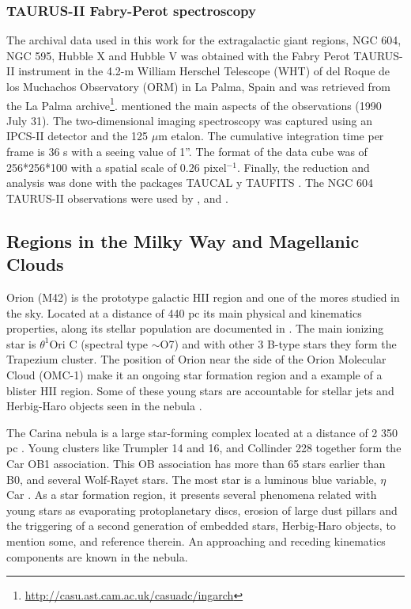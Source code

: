 \documentclass[fleqn,usenatbib, useAMS, a4paper]{mnras}
\begin{document}
\subsubsection{TAURUS-II Fabry-Perot spectroscopy}
\label{sec:taurus-ii-fabry}

The archival data used in this work for the extragalactic giant regions, NGC 604, NGC 595, Hubble X and Hubble V was obtained with the Fabry Perot TAURUS-II instrument in the 4.2-m William Herschel Telescope (WHT) of del Roque de los Muchachos Observatory (ORM) in La Palma, Spain and was retrieved from the La Palma archive\footnote{\url{http://casu.ast.cam.ac.uk/casuadc/ingarch}}.
\citet{sabalisck1995supersonic} mentioned the main aspects of the observations (1990 July 31).
The two-dimensional imaging spectroscopy was captured using an IPCS-II detector and the 125 $\mu$m etalon.
The cumulative integration time per frame is 36 s with a seeing value of 1''.
The format of the data cube was of 256*256*100 with a spatial scale of 0.26 pixel$^{-1}$.
Finally, the reduction and analysis was done with the packages TAUCAL y TAUFITS \citep{1992ASPC...25..445L}. The NGC 604 TAURUS-II observations were used by \citet{sabalisck1995supersonic}, \citet{tanco1997} and \citet{2019arXiv191203543M}.



\subsection{Regions in the Milky Way and Magellanic Clouds}
\label{sec:regions-milky-way}

Orion (M42) is the prototype galactic HII region and one of the mores studied in the sky.
Located at a distance of 440 pc \citep{2008AJ....136.1566O} its main physical and kinematics properties, along its stellar population are documented in \citet{2001ARA&A..39...99O}.
The main ionizing star is \(\theta^{1}\)Ori C (spectral type \(\sim\)O7) and with other 3 B-type stars they form the Trapezium cluster.
The position of Orion near the side of the Orion Molecular Cloud (OMC-1) make it an ongoing star formation region and a example of a blister HII region. Some of these young stars are accountable for stellar jets and Herbig-Haro objects seen in the nebula \citep{arthur2016turbulence}.

The Carina nebula is a large star-forming complex located at a distance of 2 350 pc \citep{2006ApJ...644.1151S}.
Young clusters like Trumpler 14 and 16, and Collinder 228 together form the Car OB1 association.
This OB association has more than 65 stars earlier than B0, and several Wolf-Rayet stars.
The most star is a luminous blue variable, $\eta$ Car \citep{Damiani:2016a}.
As a star formation region, it presents several phenomena related with young stars as evaporating protoplanetary discs, erosion of large dust pillars and the triggering of a second generation of embedded stars, Herbig-Haro objects, to mention some, \citet{2008hsf2.book..138S} and reference therein.
An approaching and receding kinematics components are known in the nebula.
\end{document}
